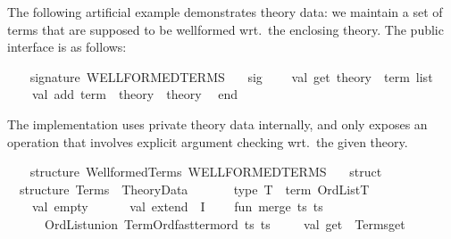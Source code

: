 \begin{isabellebody}
\begin{isamarkuptext}
\begin{description}
  \end{description}%
\end{isamarkuptext}%
\isamarkuptrue%
%
\endisatagmlref
{\isafoldmlref}%
%
\isadelimmlref
%
\endisadelimmlref
%
\isadelimmlex
%
\endisadelimmlex
%
\isatagmlex
%
\begin{isamarkuptext}%
The following artificial example demonstrates theory
  data: we maintain a set of terms that are supposed to be wellformed
  wrt.\ the enclosing theory.  The public interface is as follows:%
\end{isamarkuptext}%
\isamarkuptrue%
%
\endisatagmlex
{\isafoldmlex}%
%
\isadelimmlex
%
\endisadelimmlex
%
\isadelimML
%
\endisadelimML
%
\isatagML
{}\isamarkupfalse%
\ {\isacharverbatimopen}\isanewline
\ \ signature\ WELLFORMED{\isacharunderscore}TERMS\ {\isacharequal}\isanewline
\ \ sig\isanewline
\ \ \ \ val\ get{\isacharcolon}\ theory\ {\isacharminus}{\isachargreater}\ term\ list\isanewline
\ \ \ \ val\ add{\isacharcolon}\ term\ {\isacharminus}{\isachargreater}\ theory\ {\isacharminus}{\isachargreater}\ theory\isanewline
\ \ end{\isacharsemicolon}\isanewline
{\isacharverbatimclose}%
\endisatagML
{\isafoldML}%
%
\isadelimML
%
\endisadelimML
%
\begin{isamarkuptext}%
\noindent The implementation uses private theory data
  internally, and only exposes an operation that involves explicit
  argument checking wrt.\ the given theory.%
\end{isamarkuptext}%
\isamarkuptrue%
%
\isadelimML
%
\endisadelimML
%
\isatagML
{}\isamarkupfalse%
\ {\isacharverbatimopen}\isanewline
\ \ structure\ Wellformed{\isacharunderscore}Terms{\isacharcolon}\ WELLFORMED{\isacharunderscore}TERMS\ {\isacharequal}\isanewline
\ \ struct\isanewline
\isanewline
\ \ structure\ Terms\ {\isacharequal}\ Theory{\isacharunderscore}Data\isanewline
\ \ {\isacharparenleft}\isanewline
\ \ \ \ type\ T\ {\isacharequal}\ term\ OrdList{\isachardot}T{\isacharsemicolon}\isanewline
\ \ \ \ val\ empty\ {\isacharequal}\ {\isacharbrackleft}{\isacharbrackright}{\isacharsemicolon}\isanewline
\ \ \ \ val\ extend\ {\isacharequal}\ I{\isacharsemicolon}\isanewline
\ \ \ \ fun\ merge\ {\isacharparenleft}ts{}{\isacharcomma}\ ts{}{\isacharparenright}\ {\isacharequal}\isanewline
\ \ \ \ \ \ OrdList{\isachardot}union\ TermOrd{\isachardot}fast{\isacharunderscore}term{\isacharunderscore}ord\ ts{}\ ts{}{\isacharsemicolon}\isanewline
\ \ {\isacharparenright}\isanewline
\isanewline
\ \ val\ get\ {\isacharequal}\ Terms{\isachardot}get{\isacharsemicolon}\isanewline

\end{isabellebody}
